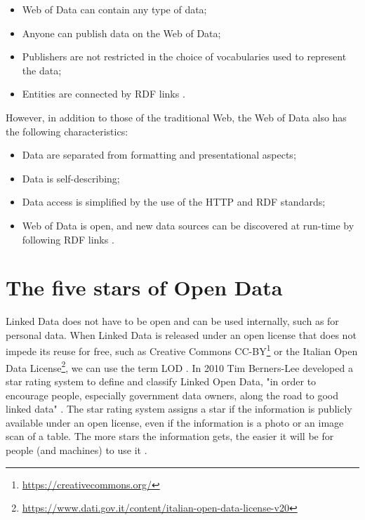 \begin{itemize}
    \item Web of Data can contain any type of data;
    \item Anyone can publish data on the Web of Data;
    \item Publishers are not restricted in the choice of vocabularies used to represent the data;
    \item Entities are connected by \ac{RDF} links \cite{bizer2011linked}.
\end{itemize}

However, in addition to those of the traditional Web, the Web of Data also has the following characteristics:

\begin{itemize}
    \item Data are separated from formatting and presentational aspects;
    \item Data is self-describing;
    \item Data access is simplified by the use of the \ac{HTTP} and \ac{RDF} standards;
    \item Web of Data is open, and new data sources can be discovered at run-time by following \ac{RDF} links \cite{bizer2011linked}.
\end{itemize}

\newcommand{\Stars}[1]{\clone{#1}{\textcolor{StarColor}{\Large$\bigstar$}}}

\section{The five stars of Open Data}
\label{sec:opendatastars}

Linked Data does not have to be open and can be used internally, such as for personal data. When Linked Data is released under an open license that does not impede its reuse for free, such as Creative Commons CC-BY\footnote{\url{https://creativecommons.org/}} or the Italian Open Data License\footnote{\url{https://www.dati.gov.it/content/italian-open-data-license-v20}}, we can use the term \ac{LOD} \cite{berners2006linked}. In 2010 Tim Berners-Lee developed a star rating system to define and classify Linked Open Data, "in order to encourage people, especially government data owners, along the road to good linked data" \cite{berners2006linked}. The star rating system assigns a star if the information is publicly available under an open license, even if the information is a photo or an image scan of a table. The more stars the information gets, the easier it will be for people (and machines) to use it \cite{berners2006linked}.

